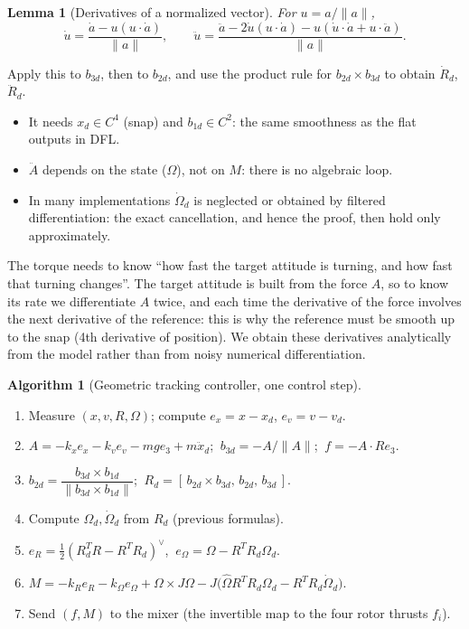 \documentclass[11pt,a4paper]{article}
\newcommand{\hatm}[1]{\widehat{#1}}          %
\newcommand{\VEE}{^{\vee}}
\newcommand{\eR}{e_R}
\newcommand{\eO}{e_\Omega}
\newcommand{\ex}{e_x}
\newcommand{\ev}{e_v}
\newcommand{\Od}{\Omega_d}
\theoremstyle{definition}
\newtheorem{algorithm}[definition]{Algorithm}
\theoremstyle{plain}
\newtheorem{lemma}[definition]{Lemma}
\theoremstyle{remark}
\begin{document}
\begin{lemma}[Derivatives of a normalized vector]
For $u=a/\|a\|$,
\[
\dot u=\frac{\dot a-u(u\cdot\dot a)}{\|a\|},\qquad
\ddot u=\frac{\ddot a-2\dot u(u\cdot\dot a)-u(\dot u\cdot\dot a+u\cdot\ddot a)}{\|a\|}.
\]
\end{lemma}

Apply this to $b_{3d}$, then to $b_{2d}$, and use the product rule for $b_{2d}\times b_{3d}$ to obtain $\dot R_d$, $\ddot R_d$.

\begin{itemize}
  \item It needs $x_d\in C^4$ (snap) and $b_{1d}\in C^2$: the same smoothness as the flat outputs in DFL.
  \item $\ddot A$ depends on the state ($\Omega$), not on $M$: there is no algebraic loop.
  \item In many implementations $\dot\Omega_d$ is neglected or obtained by filtered differentiation: the exact cancellation, and hence the proof, then hold only approximately.
\end{itemize}

\begin{intuition}
The torque needs to know ``how fast the target attitude is turning, and how fast that turning changes''. The target attitude is built from the force $A$, so to know its rate we differentiate $A$ twice, and each time the derivative of the force involves the next derivative of the reference: this is why the reference must be smooth up to the snap (4th derivative of position). We obtain these derivatives analytically from the model rather than from noisy numerical differentiation.
\end{intuition}

\begin{algorithm}[Geometric tracking controller, one control step]
\begin{enumerate}[nosep]
  \item Measure $(x,v,R,\Omega)$; compute $\ex=x-x_d$, $\ev=v-v_d$.
  \item $A=-k_x\ex-k_v\ev-mge_3+m\ddot x_d$; $\ b_{3d}=-A/\|A\|$; $\ f=-A\cdot Re_3$.
  \item $b_{2d}=\dfrac{b_{3d}\times b_{1d}}{\|b_{3d}\times b_{1d}\|}$; $\ R_d=[\,b_{2d}\times b_{3d},\,b_{2d},\,b_{3d}\,]$.
  \item Compute $\Od,\dot\Omega_d$ from $R_d$ (previous formulas).
  \item $\eR=\tfrac12(R_d^TR-R^TR_d)\VEE$, $\ \eO=\Omega-R^TR_d\Od$.
  \item $M=-k_R\eR-k_\Omega\eO+\Omega\times J\Omega-J\big(\hatm\Omega R^TR_d\Od-R^TR_d\dot\Omega_d\big)$.
  \item Send $(f,M)$ to the mixer (the invertible map to the four rotor thrusts $f_i$).
\end{enumerate}
\end{algorithm}
\end{document}
